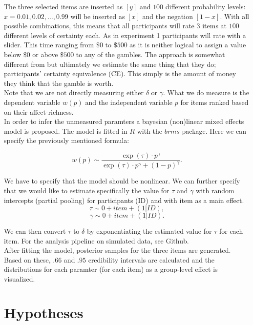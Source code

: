 \documentclass[12pt]{article}
\begin{document}
The three selected items are inserted as $[y]$
and $100$ different probability levels:
$x = 0.01, 0.02, \ldots, 0.99$ will be
inserted as $[x]$ and the negation $[1-x]$.
With all
possible combinations, this means that
all participants will rate $3$ items
at $100$ different levels of certainty each.
As in experiment 1 participants will rate
with a slider. This time ranging from
$\$0$ to $\$500$ as it is neither logical
to assign a value below $\$0$ or above
$\$500$ to any of the gambles.
The approach is somewhat
different from \textcite{gonzalez1999shape}
but ultimately we estimate the same thing that
they do; participants' certainty equivalence (CE).
This simply is the amount of money they think
that the gamble is worth. \\

Note that we are not directly measuring either
$\delta$ or $\gamma$. What we do measure is the
dependent variable $w(p)$ and the independent
variable $p$ for items ranked based on their
affect-richness. \\

In order to infer the
unmeasured paramters a bayesian (non)linear
mixed effects model is proposed. The model
is fitted in $R$ with the  $brms$ package.
Here we can specify the previously
mentioned formula:

 \[
	 w(p) \sim \frac{\exp({\tau})\cdot p^{\gamma}}
	 {\exp({\tau})\cdot p^{\gamma}+(1-p)^{\gamma}}
.\]

We have to specify that the model should
be nonlinear. We can further specify that we would like to
estimate specifically the value for $\tau$
and $\gamma$ with random intercepts (partial pooling)
for participants (ID) and with item as a main
effect. \\

 \[
	 \tau \sim 0 + item + (1|ID),
\]
\[
	\gamma \sim 0 + item + (1|ID)
.\]

We can then convert $\tau$ to $\delta$
by exponentiating the estimated value
for $\tau$ for each item. For the analysis
pipeline on simulated data, see Github. \\

After fitting the model, posterior samples
for the three items are generated. Based on
these, $.66$ and $.95$ credibility intervals
are calculated and the distributions for each
paramter (for each item) as a group-level effect
is visualized.

\section{Hypotheses}
\end{document}
